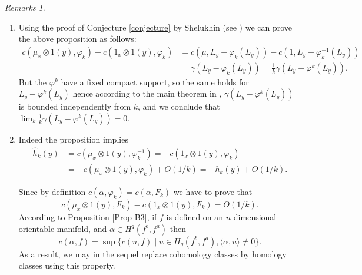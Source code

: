 \documentclass[JEP,XML,SOM,NoFloatCountersInSection,Unicode,published]{cedram}
\numberwithin{equation}{section}
\let \phi \varphi
\theoremstyle{plain}
\theoremstyle{definition}
\theoremstyle{remark}
\newtheorem{remarks}[theorem]{Remarks}
\begin{document}
\skpt
\begin{remarks}
\begin{enumerate}
\item Using the proof of Conjecture \ref{conjecture} by Shelukhin (see \cite{Shelukhin}) we can prove the above proposition as follows:
\begin{align*}
c(\mu_x\otimes1(y),\varphi_k)- c(1_x\otimes1(y),\varphi_k)&=c(\mu,L_y-\varphi_k(L_y))-c(1,L_y-\varphi_k^{-1}(L_y))\\ &=\gamma (L_y-\varphi_k(L_{y}))= \frac{1}{k}\gamma (L_y-\varphi^k(L_y)).
\end{align*}
But the $\varphi^k$ have a fixed compact support, so the same holds for $L_y-\varphi^k(L_y)$ hence according to the main theorem in \cite{Shelukhin}, $\gamma (L_y-\varphi^k(L_y))$ is bounded independently from $k$, and we conclude that $\lim_k\frac{1}{k}\gamma (L_y-\varphi^k(L_y))
=0$.
\item Indeed the proposition implies
\begin{align*}
\widehat h_{k}(y)&=c(\mu_{x}\otimes 1(y), \phi_{k}^{-1})=-c(1_x\otimes1(y),\varphi_k)\\
&=-c(\mu_x\otimes 1(y),\varphi_k)+O(1/k)=-h_k(y)+O(1/k).
\end{align*}

Since by definition $c(\alpha,\varphi_k)= c(\alpha,F_k)$ we have to prove that
\[
c(\mu_x\otimes 1(y),F_k)-c(1_x\otimes1(y),F_k)=O(1/k).
\]
According to Proposition \ref{Prop-B3}, if $f$ is defined on an $n$-dimensional orientable manifold, and $\alpha \in H^q(f^b,f^a)$
then
\[
c(\alpha, f) = \sup\{ c(u,f) \mid u\in H_q(f^b,f^a), \langle \alpha,u\rangle\neq 0\}.
\]
As a result, we may in the sequel replace cohomology classes by homology classes using this property.
\end{enumerate}
\end{remarks}
\end{document}
